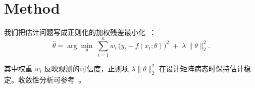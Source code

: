 \section{Method}

我们把估计问题写成正则化的加权残差最小化~\cite{boyd2004}：
\begin{equation}
  \label{eq:objective}
  \hat{\theta} = \arg\min_{\theta}\; \sum_{i=1}^{n} w_i\,\bigl(y_i - f(x_i;\theta)\bigr)^2
  \;+\; \lambda\,\lVert\theta\rVert_2^2 .
\end{equation}

其中权重 $w_i$ 反映观测的可信度，正则项 $\lambda\lVert\theta\rVert_2^2$
在设计矩阵病态时保持估计稳定。收敛性分析可参考~\cite{cover2006}。
